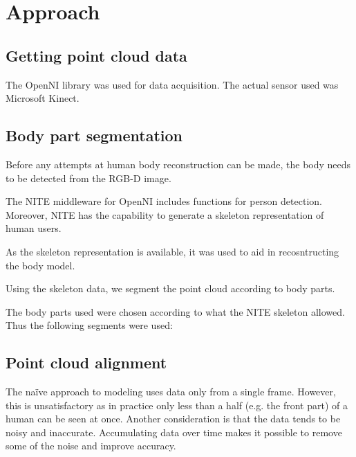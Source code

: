 \chapter{Approach}

\section{Getting point cloud data}


The OpenNI library \citep{OpenNI}
was used for data acquisition. The actual sensor used was Microsoft Kinect.

\section{Body part segmentation}

Before any attempts at human body reconstruction can be made, the body needs to be detected from the RGB-D image. 

The NITE middleware for OpenNI \citep{NITE}
includes functions for person detection. Moreover, NITE has the capability to generate a skeleton representation of human users.

As the skeleton representation is available, it was used to aid in recosntructing the body model.

Using the skeleton data, we segment the point cloud according to body parts.

The body parts used were chosen according to what the NITE skeleton allowed. Thus the following segments were used:


\section{Point cloud alignment}

The naïve approach to modeling uses data only from a single frame. However, this is unsatisfactory as in practice only less than a half (e.g. the front part) of a human can be seen at once. Another consideration is that the data tends to be noisy and inaccurate. Accumulating data over time makes it possible to remove some of the noise and improve accuracy.

